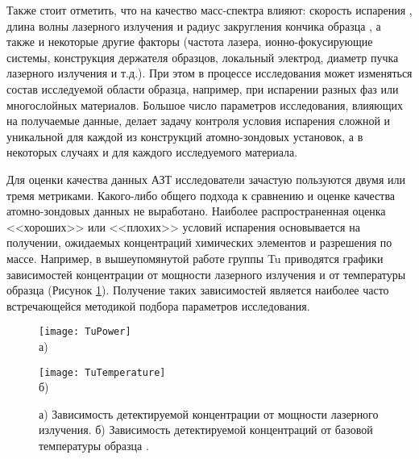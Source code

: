 Также стоит отметить, что на качество масс-спектра влияют: скорость испарения \cite{Raznitsyn18}, длина волны лазерного излучения и радиус закругления кончика образца \cite{Houard10}, а также и некоторые другие факторы (частота лазера, ионно-фокусирующие системы, конструкция держателя образцов, локальный электрод, диаметр пучка лазерного излучения и т.д.). При этом в процессе исследования может изменяться состав исследуемой области образца, например, при испарении разных фаз или многослойных материалов. Большое число параметров исследования, влияющих на получаемые данные, делает задачу контроля условия испарения сложной и уникальной для каждой из конструкций атомно-зондовых установок, а в некоторых случаях и для каждого исследуемого материала. 

Для оценки качества данных АЗТ исследователи зачастую пользуются двумя или тремя метриками. Какого-либо общего подхода к сравнению  и оценке качества атомно-зондовых данных не выработано. Наиболее распространенная оценка <<хороших>> или <<плохих>> условий испарения основывается на получении, ожидаемых концентраций химических элементов и разрешения по массе. Например, в вышеупомянутой работе группы Tu \cite{Tu15} приводятся графики зависимостей концентрации от мощности лазерного излучения и от температуры образца (Рисунок \cref{fig:TuComposition}). Получение таких зависимостей является наиболее часто встречающейся методикой подбора параметров исследования. 

\begin{figure}[htb]
	\begin{minipage}[b]{0.49\textwidth}\centering
		\texttt{[image: TuPower]} \\ а)
	\end{minipage}
	\begin{minipage}[b]{0.49\textwidth}\centering
		\texttt{[image: TuTemperature]} \\ б)
	\end{minipage}
	\caption{а) Зависимость детектируемой концентрации от мощности лазерного излучения. б) Зависимость детектируемой концентраций от базовой температуры образца \cite{Tu15}.}
	\label{fig:TuComposition}
\end{figure}

